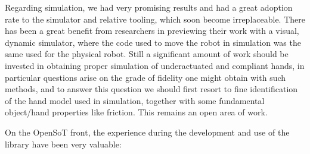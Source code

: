 \documentclass[%
	paper=A4,					%
	twoside=true,				%
	openright,			.
	parskip=full,				%
	chapterprefix=true,			%
	11pt,						%
	headings=normal,			%
	bibliography=totoc,			%
	listof=totoc,				%
	titlepage=on,				%
	captions=tableabove,		%
	draft=true,				%
]{scrreprt}%
\begin{document}
Regarding simulation, we had very promising results and had a great adoption rate to the simulator and relative tooling, which soon become irreplaceable. There has been a great benefit from researchers in previewing their work with a visual, dynamic simulator, where the code used to move the robot in simulation was the same used for the physical robot. Still a significant amount of work should be invested in obtaining proper simulation of underactuated and compliant hands, in particular questions arise on the grade of fidelity one might obtain with such methods, and to answer this question we should first resort to fine identification of the hand model used in simulation, together with some fundamental object/hand properties like friction. This remains an open area of work.

On the OpenSoT front, the experience during the development and use of the library have been very valuable:
\end{document}
